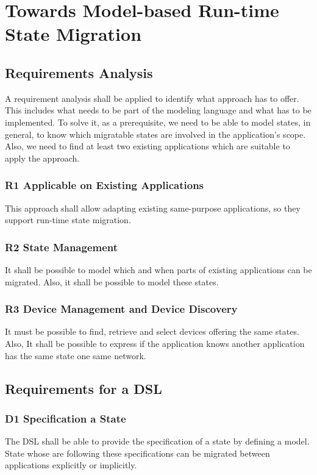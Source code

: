 \chapter{Towards Model-based Run-time State Migration}
\label{ch:requirements}

\section{Requirements Analysis}

A requirement analysis shall be applied to identify what approach has to offer. This includes what needs to be part of the modeling language and what has to be implemented. To solve it, as a prerequisite, we need to be able to model states, in general, to know which migratable states are involved in the application's scope. Also, we need to find at least two existing applications which are suitable to apply the approach.

\subsection{R1 Applicable on Existing Applications}
This approach shall allow adapting existing same-purpose applications, so they support run-time state migration.

\subsection{R2 State Management}
It shall be possible to model which and when parts of existing applications can be migrated. Also, it shall be possible to model these states.

\subsection{R3 Device Management and Device Discovery}
It must be possible to find, retrieve and select devices offering the same states. Also, It shall be possible to express if the application knows another application has the same state one same network.

\section{Requirements for a DSL}

\subsection{D1 Specification a State}
The DSL shall be able to provide the specification of a state by defining a model. State whose are following these specifications can be migrated between applications explicitly or implicitly.
